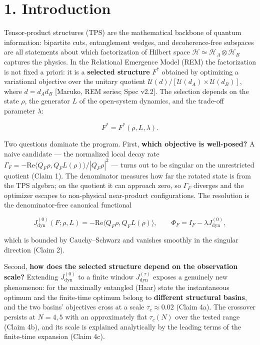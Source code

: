 \documentclass[
]{article}
\begin{document}
\section{1. Introduction}\label{introduction}

Tensor-product structures (TPS) are the mathematical backbone of quantum
information: bipartite cuts, entanglement wedges, and decoherence-free
subspaces are all statements about which factorization of Hilbert space
\(\mathcal{H} \simeq \mathcal{H}_A \otimes \mathcal{H}_B\) captures the
physics. In the Relational Emergence Model (REM) the factorization is
not fixed a priori: it is a \textbf{selected structure} \(F^*\) obtained
by optimizing a variational objective over the unitary quotient
\(\mathcal{U}(d)/[\mathcal{U}(d_A)\times\mathcal{U}(d_B)]\), where
\(d = d_A d_B\) {[}Maruko, REM series; Spec v2.2{]}. The selection
depends on the state \(\rho\), the generator \(L\) of the open-system
dynamics, and the trade-off parameter \(\lambda\):

\[F^* = F^*(\rho, L, \lambda).\]

Two questions dominate the program. First, \textbf{which objective is
well-posed?} A naive candidate --- the normalized local decay rate
\(\Gamma_F = -\mathrm{Re}\langle Q_F\rho, Q_FL(\rho)\rangle/|Q_F\rho|^2\)
--- turns out to be singular on the unrestricted quotient (Claim 1). The
denominator measures how far the rotated state is from the TPS algebra;
on the quotient it can approach zero, so \(\Gamma_F\) diverges and the
optimizer escapes to non-physical near-product configurations. The
resolution is the denominator-free canonical functional

\[J_{\mathrm{dyn}}^{(0)}(F;\rho,L) = -\mathrm{Re}\langle Q_F\rho, Q_F
L(\rho)\rangle, \qquad \Phi_F = I_F - \lambda J_{\mathrm{dyn}}^{(0)},\]

which is bounded by Cauchy--Schwarz and vanishes smoothly in the
singular direction (Claim 2).

Second, \textbf{how does the selected structure depend on the
observation scale?} Extending \(J_{\mathrm{dyn}}^{(0)}\) to a finite
window \(J_{\mathrm{dyn}}^{(\tau)}\) exposes a genuinely new phenomenon:
for the maximally entangled (Haar) state the instantaneous optimum and
the finite-time optimum belong to \textbf{different structural basins},
and the two basins' objectives cross at a scale \(\tau_c \approx 0.02\)
(Claim 4a). The crossover persists at \(N=4,5\) with an approximately
flat \(\tau_c(N)\) over the tested range (Claim 4b), and its scale is
explained analytically by the leading terms of the finite-time expansion
(Claim 4c).
\end{document}
